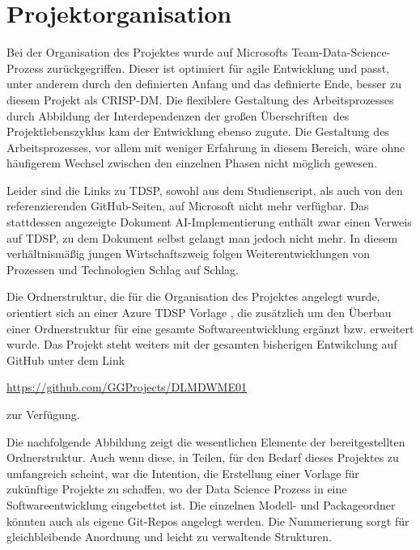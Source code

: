 \chapter{Projektorganisation}

Bei der Organisation des Projektes wurde auf Microsofts Team-Data-Science-Prozess zurückgegriffen. Dieser ist optimiert für agile Entwicklung und passt, unter anderem durch den definierten Anfang und das definierte Ende, besser zu diesem Projekt als CRISP-DM. Die flexiblere Gestaltung des Arbeitsprozesses durch Abbildung der Interdependenzen der großen \glqq Überschriften\grqq\ des Projektlebenszyklus kam der Entwicklung ebenso zugute. Die Gestaltung des Arbeitsprozesses, vor allem mit weniger Erfahrung in diesem Bereich, wäre ohne häufigerem Wechsel zwischen den einzelnen Phasen nicht möglich gewesen.

Leider sind die Links zu TDSP, sowohl aus dem Studienscript, als auch von den referenzierenden GitHub-Seiten, auf Microsoft nicht mehr verfügbar. Das stattdessen angezeigte Dokument AI-Implementierung enthält zwar einen Verweis auf TDSP, zu dem Dokument selbst gelangt man jedoch nicht mehr. In diesem verhältnismäßig jungen Wirtschaftszweig folgen Weiterentwicklungen von Prozessen und Technologien Schlag auf Schlag.

Die Ordnerstruktur, die für die Organisation des Projektes angelegt wurde, orientiert sich an einer Azure TDSP Vorlage \citep{microsoft_azure_azure-tdsp-projecttemplate_2023}, die zusätzlich um den Überbau einer Ordnerstruktur für eine gesamte Softwareentwicklung ergänzt bzw. erweitert wurde. Das Projekt steht weiters mit der gesamten bisherigen Entwikclung auf GitHub unter dem Link 

\begin{center}\url{https://github.com/GGProjects/DLMDWME01}\end{center} 

zur Verfügung.

Die nachfolgende Abbildung zeigt die wesentlichen Elemente der bereitgestellten Ordnerstruktur. Auch wenn diese, in Teilen, für den Bedarf dieses Projektes zu umfangreich scheint, war die Intention, die Erstellung einer Vorlage für zukünftige Projekte zu schaffen, wo der Data Science Prozess in eine Softwareentwicklung eingebettet ist. Die einzelnen Modell- und Packageordner könnten auch als eigene Git-Repos angelegt werden. Die Nummerierung sorgt für gleichbleibende Anordnung und leicht zu verwaltende Strukturen.


